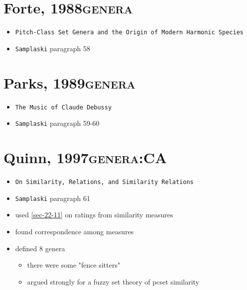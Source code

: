 \documentclass[11pt]{article}
\begin{document}
{{\section{Forte, 1988\hfill{}\textsc{genera}}
\label{sec-16}
\begin{itemize}
\item \texttt{Pitch-Class Set Genera and the Origin of Modern Harmonic Species}
\item \texttt{Samplaski} paragraph 58
\end{itemize}

\section{Parks, 1989\hfill{}\textsc{genera}}
\label{sec-17}
\begin{itemize}
\item \texttt{The Music of Claude Debussy}
\item \texttt{Samplaski} paragraph 59-60
\end{itemize}

\section{Quinn, 1997\hfill{}\textsc{genera:CA}}
\label{sec-18}
\begin{itemize}
\item \texttt{On Similarity, Relations, and Similarity Relations}
\item \texttt{Samplaski} paragraph 61
\item used \ref{sec-22-11} on ratings from similarity measures
\item found correspondence among measures
\item defined 8 genera
\begin{itemize}
\item there were some "fence sitters"
\item argued strongly for a fuzzy set theory of pcset similarity
\end{itemize}
\end{itemize}

}}
\end{document}
